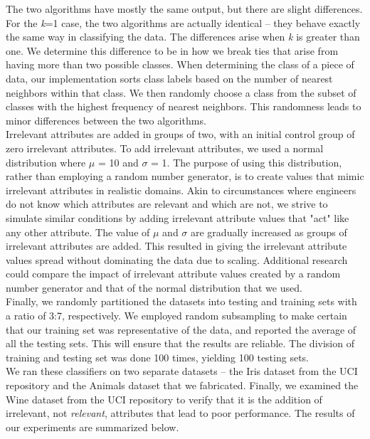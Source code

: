 \documentclass{article}
\begin{document}
The two algorithms have mostly the same output, but there are slight differences. For the \textit{k}=1 case, the two algorithms are actually identical -- they behave exactly the same way in classifying the data. The differences arise when \textit{k} is greater than one. We determine this difference to be in how we break ties that arise from having more than two possible classes. When determining the class of a piece of data, our implementation sorts class labels based on the number of nearest neighbors within that class. We then randomly choose a class from the subset of classes with the highest frequency of nearest neighbors. This randomness leads to minor differences between the two algorithms. \\

Irrelevant attributes are added in groups of two, with an initial control group of zero irrelevant attributes. To add irrelevant attributes, we used a normal distribution where $\mu$ = 10 and $\sigma$ = 1. The purpose of using this distribution, rather than employing a random number generator, is to create values that mimic irrelevant attributes in realistic domains. Akin to circumstances where engineers do not know which attributes are relevant and which are not, we strive to simulate similar conditions by adding irrelevant attribute values that "act" like any other attribute. The value of $\mu$ and $\sigma$ are gradually increased as groups of irrelevant attributes are added. This resulted in giving the irrelevant attribute values spread without dominating the data due to scaling. Additional research could compare the impact of irrelevant attribute values created by a random number generator and that of the normal distribution that we used.  \\

Finally, we randomly partitioned the datasets into testing and training sets with a ratio of 3:7, respectively. We employed random subsampling to make certain that our training set was representative of the data, and reported the average of all the testing sets. This will ensure that the results are reliable. The division of training and testing set was done 100 times, yielding 100 testing sets. \\   

We ran these classifiers on two separate datasets -- the Iris dataset from the UCI repository and the Animals dataset that we fabricated. Finally, we examined the Wine dataset from the UCI repository to verify that it is the addition of irrelevant, not \textit{relevant}, attributes that lead to poor performance.  The results of our experiments are summarized below.
\end{document}
